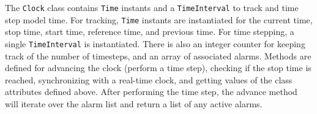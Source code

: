
The {\tt Clock} class contains {\tt Time} instants and a {\tt TimeInterval}
to track and time step model time.  For tracking, {\tt Time} instants are
instantiated for the current time, stop time, start time, reference time,
and previous time.  For time stepping, a single {\tt TimeInterval} is
instantiated.  There is also an integer counter for keeping track of the
number of timesteps, and an array of associated alarms.  Methods are
defined for advancing the clock (perform a time step), checking if the
stop time is reached, synchronizing with a real-time clock, and getting
values of the class attributes defined above. After performing the time
step, the advance method will iterate over the alarm list and return a
list of any active alarms.
